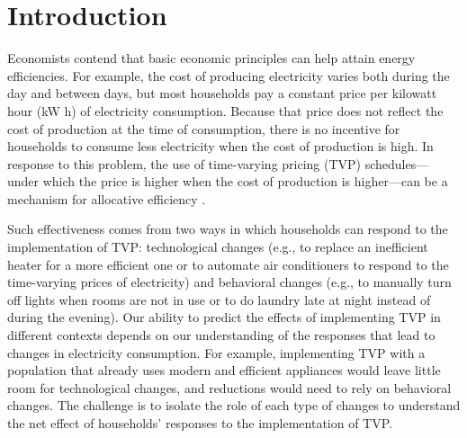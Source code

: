 \documentclass[12pt]{article}
\begin{document}

% 




\section{Introduction}

Economists contend that basic economic principles can help attain energy efficiencies. For example, the cost of producing electricity varies both during the day and between days, but most households pay a constant price per kilowatt hour (kW h) of electricity consumption. Because that price does not reflect the cost of production at the time of consumption, there is no incentive for households to consume less electricity when the cost of production is high. In response to this problem, the use of time-varying pricing (TVP) schedules--- under which the price is higher when the cost of production is higher---can be a mechanism for allocative efficiency \citep{allcottRethinkingRealtimeElectricity2011,wolakResidentialCustomersRespond2011,jessoeUnderstandingRolePrice2014}.

Such effectiveness comes from two ways in which households can respond to the implementation of TVP: technological changes (e.g., to replace an inefficient heater for a more efficient one or to automate air conditioners to respond to the time-varying prices of electricity) and behavioral changes (e.g., to manually turn off lights when rooms are not in use or to do laundry late at night instead of during the evening). Our ability to predict the effects of implementing TVP in different contexts depends on our understanding of the responses that lead to changes in electricity consumption. For example, implementing TVP with a population that already uses modern and efficient appliances would leave little room for technological changes, and reductions would need to rely on behavioral changes. The challenge is to isolate the role of each type of changes to understand the net effect of households’ responses to the implementation of TVP.
\end{document}
